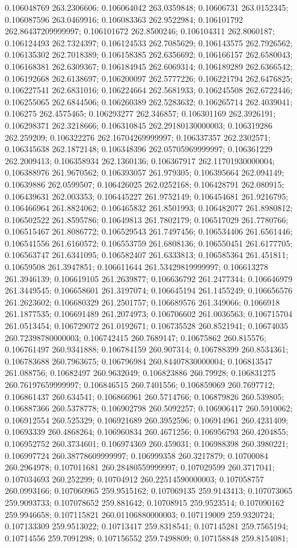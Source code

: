 0.106048769 263.2306606; 0.106064042 263.0359848; 0.10606731 263.0152345; 0.106087596 263.0469916; 0.106083363 262.9522984; 0.106101792 262.86437209999997; 0.106101672 262.8500246; 0.106104311 262.8060187; 0.106124493 262.7324397; 0.106124533 262.7085629; 0.106143575 262.7926562; 0.106135302 262.7018389; 0.106158385 262.6356692; 0.106166157 262.6580043; 0.106168381 262.6309367; 0.106184945 262.6069314; 0.106189289 262.6366542; 0.106192668 262.6138697; 0.106200097 262.5777226; 0.106221794 262.6476825; 0.106227541 262.6831016; 0.106224664 262.5681933; 0.106245508 262.6722446; 0.106255065 262.6844506; 0.106260389 262.5283632; 0.106265714 262.4039041; 0.106275 262.4575465; 0.106293277 262.346857; 0.106301169 262.3926191; 0.106298371 262.3218666; 0.106310845 262.29180130000003; 0.106319286 262.259209; 0.106322276 262.16704269999997; 0.106337357 262.2302571; 0.106345638 262.1872148; 0.106348396 262.05705969999997; 0.106361229 262.2009413; 0.106358934 262.1360136; 0.106367917 262.11701930000004; 0.106388976 261.9670562; 0.106393057 261.979305; 0.106395664 262.094149; 0.10639886 262.0599507; 0.106426025 262.0252168; 0.106428791 262.080915; 0.106439631 262.003353; 0.106445227 261.9752149; 0.106454681 261.9216795; 0.106466964 261.8824062; 0.106465832 261.8501993; 0.106482077 261.8980812; 0.106502522 261.8595786; 0.10649813 261.7802179; 0.106517029 261.7780766; 0.106515467 261.8086772; 0.106529543 261.7497456; 0.106534406 261.6561446; 0.106541556 261.6160572; 0.106553759 261.6808136; 0.106550451 261.6177705; 0.106563747 261.6341095; 0.106582407 261.6333813; 0.106585364 261.451811; 0.10659508 261.3947851; 0.106611644 261.53429819999997; 0.106613278 261.3946139; 0.106619105 261.2639877; 0.106636792 261.2477344; 0.106646979 261.3449545; 0.106658601 261.3197074; 0.106645194 261.1455249; 0.106656576 261.2623602; 0.106680329 261.2501757; 0.106689576 261.349066; 0.1066918 261.1877535; 0.106691489 261.2074973; 0.106706602 261.0036563; 0.106715704 261.0513454; 0.106729072 261.0192671; 0.106735528 260.8521941; 0.10674035 260.72398780000003; 0.106742415 260.7689147; 0.10675862 260.815576; 0.106761497 260.9341888; 0.106784159 260.907314; 0.106788399 260.8534361; 0.106783688 260.7963675; 0.106796984 260.84407830000004; 0.106813547 261.088756; 0.10682497 260.9632049; 0.106823886 260.79928; 0.106831275 260.76197659999997; 0.106846515 260.7401556; 0.106859069 260.7697712; 0.106861437 260.634541; 0.106866961 260.5714766; 0.106879826 260.539805; 0.106887366 260.5378778; 0.106902798 260.5092257; 0.106906417 260.5910062; 0.106912554 260.525329; 0.106921689 260.3952596; 0.106914961 260.4231409; 0.10693339 260.4868264; 0.106960834 260.4671256; 0.106956793 260.4204855; 0.106952752 260.3734601; 0.106974369 260.459031; 0.106988398 260.3980221; 0.106997724 260.38778609999997; 0.106999358 260.3217879; 0.10700084 260.2964978; 0.107011681 260.28480559999997; 0.107029599 260.3717041; 0.107034693 260.252299; 0.10704912 260.22514590000003; 0.107058757 260.0993166; 0.107060965 259.9515162; 0.107069135 259.9143413; 0.107073065 259.9093733; 0.107078652 259.881642; 0.10708915 259.9523514; 0.107090162 259.9946658; 0.107115821 260.01106880000003; 0.107119009 259.9320724; 0.107133309 259.9513022; 0.10713417 259.8318541; 0.107145281 259.7565194; 0.10714556 259.7091298; 0.107156552 259.7498809; 0.107158848 259.8154081; 